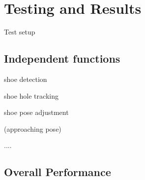 \chapter{Testing and Results}

Test setup

\section{Independent functions}

shoe detection

shoe hole tracking 

shoe pose adjustment

(approaching pose)

....

\section{Overall Performance}

